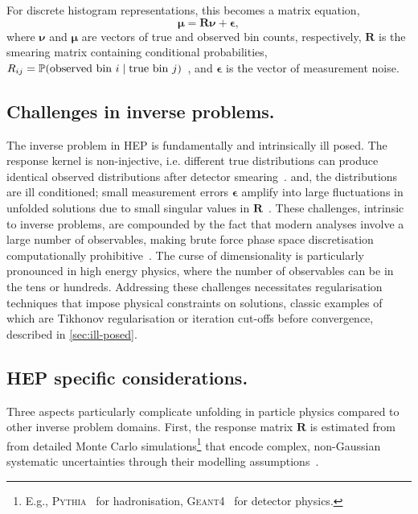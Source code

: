 For discrete histogram representations, this becomes a matrix equation,
\begin{equation}
    \label{eq:forward-binned}
    \boldsymbol{\mu} = \mathbf{R}\boldsymbol{\nu} + \boldsymbol{\epsilon},
\end{equation}
where \(\boldsymbol{\nu}\) and \(\boldsymbol{\mu}\) are vectors of true and observed bin counts, respectively, \(\mathbf{R}\) is the smearing matrix containing conditional probabilities, \(R_{ij} = \P(\text{observed bin } i \mid \text{true bin } j)\)~\cite{cms_collaboration_measurement_2011}, and \(\boldsymbol{\epsilon}\) is the vector of measurement noise.

    \subsection{Challenges in inverse problems.}
        The inverse problem in HEP is fundamentally and intrinsically ill posed.
        The response kernel is non-injective, i.e. different true distributions can produce identical observed distributions after detector smearing~\cite{palumbo_convergence_2025, neumaier_solving_1998, weinberg_elementary_1963}.
        and, the distributions are ill conditioned; small measurement errors \(\boldsymbol{\epsilon}\) amplify into large fluctuations in unfolded solutions due to small singular values in \(\mathbf{R}\)~\cite{ChungA, fernandez-martinez_effect_2014, carpio_inverse_2008}.
        These challenges, intrinsic to inverse problems, are compounded by the fact that modern analyses involve a large number of observables, making brute force phase space discretisation computationally prohibitive~\cite{arratia_optimizing_2022, gaponenko_practical_2020, chan_unbinned_2023}.
        The curse of dimensionality is particularly pronounced in high energy physics, where the number of observables can be in the tens or hundreds.
        Addressing these challenges necessitates regularisation techniques that impose physical constraints on solutions, classic examples of which are Tikhonov regularisation or iteration cut-offs before convergence, described in \cref{sec:ill-posed}.

    \subsection{HEP specific considerations.}
        Three aspects particularly complicate unfolding in particle physics compared to other inverse problem domains.
        First, the response matrix \(\mathbf{R}\) is estimated from from detailed Monte Carlo simulations\footnote{E.g., \textsc{Pythia}~\cite{bierlich_comprehensive_2022} for hadronisation, \textsc{Geant4}~\cite{allison_recent_2016} for detector physics.} that encode complex, non-Gaussian systematic uncertainties through their modelling assumptions~\cite{bozson_unfolding_2018, schmitt_data_2017, blobel_unfolding_2011, Huang2025MachineTechnique}.

